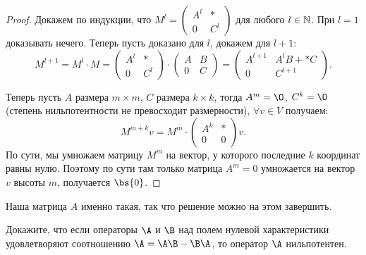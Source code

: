 \begin{solution}
    \begin{proof}
        Докажем по индукции, что
        $
        M^l =
        \begin{pmatrix}
            A^l & \ast\\
            0 & C^l
        \end{pmatrix}
        $ для любого $l \in \mathbb{N}$. При $l = 1$ доказывать нечего. Теперь пусть доказано для $l$, докажем для $l + 1$:
        \[
            M^{l + 1} = M^l \cdot M =
            \begin{pmatrix}
                A^l & \ast\\
                0 & C^l
            \end{pmatrix} \cdot
            \begin{pmatrix}
                A & B\\
                0 & C
            \end{pmatrix} =
            \begin{pmatrix}
                A^{l + 1} & A^lB + \ast C\\
                0 & C^{l + 1}
            \end{pmatrix}.
        \]

        Теперь пусть $A$ размера $m \times m$, $C$ размера $k \times k$, тогда $A^m = \O$, $C^k = \O$ (степень нильпотентности не превосходит размерности), $\forall v \in V$ получаем:
        \[
            M^{m + k}v = M^m \cdot
            \begin{pmatrix}
                A^k & \ast\\
                0 & 0
            \end{pmatrix}v.
        \]
        По сути, мы умножаем матрицу $M^m$ на вектор, у которого последние $k$ координат равны нулю. Поэтому по сути там только матрица $A^m = 0$ умножается на вектор $v$ высоты $m$, получается $\bs{0}$.
    \end{proof}

    Наша матрица $A$ именно такая, так что решение можно на этом завершить.
\end{solution}

\begin{problem}
    Докажите, что если операторы $\A$ и $\B$ над полем нулевой характеристики удовлетворяют соотношению $\A = \A\B - \B\A$, то оператор $\A$ нильпотентен.
\end{problem}

